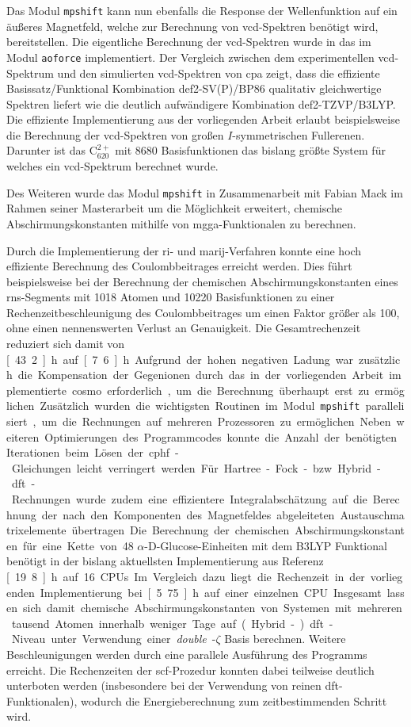 Das Modul \texttt{mpshift} kann nun ebenfalls die Response der Wellenfunktion auf ein äußeres Magnetfeld, welche zur Berechnung von \ac{vcd}-Spektren benötigt wird, bereitstellen. Die eigentliche Berechnung der \ac{vcd}-Spektren wurde in das im Modul \texttt{aoforce} implementiert. Der Vergleich zwischen dem experimentellen \ac{vcd}-Spektrum und den simulierten \ac{vcd}-Spektren von \acl{cpa} zeigt, dass die effiziente Basissatz/Funktional Kombination def2-SV(P)/BP86 qualitativ gleichwertige Spektren liefert wie die deutlich aufwändigere Kombination def2-TZVP/B3LYP. Die effiziente Implementierung aus der vorliegenden Arbeit erlaubt beispielsweise die Berechnung der \ac{vcd}-Spektren von großen $I$-symmetrischen Fullerenen. Darunter ist das C$_{620}^{2+}$ mit 8680 Basisfunktionen das bislang größte System für welches ein \ac{vcd}-Spektrum berechnet wurde.

Des Weiteren wurde das Modul \texttt{mpshift} in Zusammenarbeit mit Fabian Mack im Rahmen seiner Masterarbeit um die Möglichkeit erweitert, chemische Abschirmungskonstanten mithilfe von \ac{mgga}-Funktionalen zu berechnen. 

\bigskip
Durch die Implementierung der \ac{ri}- und \ac{marij}-Verfahren konnte eine hoch effiziente Berechnung des Coulombbeitrages erreicht werden. Dies führt beispielsweise bei der Berechnung der chemischen Abschirmungskonstanten eines \ac{rns}-Segments mit 1018 Atomen und 10220 Basisfunktionen zu einer Rechenzeitbeschleunigung des Coulombbeitrages um einen Faktor größer als 100, ohne einen nennenswerten Verlust an Genauigkeit. Die Gesamtrechenzeit reduziert sich damit von \unit[43.2]{h} auf \unit[7.6]{h}. Aufgrund der hohen negativen Ladung war zusätzlich die Kompensation der Gegenionen durch das in der vorliegenden Arbeit implementierte \ac{cosmo} erforderlich, um die Berechnung überhaupt erst zu ermöglichen. Zusätzlich wurden die wichtigsten Routinen im Modul \texttt{mpshift} parallelisiert, um die Rechnungen auf mehreren Prozessoren zu ermöglichen. Neben weiteren Optimierungen des Programmcodes konnte die Anzahl der benötigten Iterationen beim Lösen der \ac{cphf}-Gleichungen leicht verringert werden. Für Hartree-Fock- bzw. Hybrid-\ac{dft}-Rechnungen wurde zudem eine effizientere Integralabschätzung auf die Berechnung der nach den Komponenten des Magnetfeldes abgeleiteten Austauschmatrixelemente übertragen. Die Berechnung der chemischen Abschirmungskonstanten für eine Kette von 48 $\alpha$-D-Glucose-Einheiten mit dem B3LYP Funktional benötigt in der bislang aktuellsten Implementierung aus Referenz \cite{kumar2016nuclei} \unit[19.8]{h} auf 16 CPUs. Im Vergleich dazu liegt die Rechenzeit in der vorliegenden Implementierung bei \unit[5.75]{h} auf einer einzelnen CPU. Insgesamt lassen sich damit chemische Abschirmungskonstanten von Systemen mit mehreren tausend Atomen innerhalb weniger Tage auf (Hybrid-)\ac{dft}-Niveau unter Verwendung einer \textit{double}-$\zeta$ Basis berechnen. Weitere Beschleunigungen werden durch eine parallele Ausführung des Programms erreicht. Die Rechenzeiten der \ac{scf}-Prozedur konnten dabei teilweise deutlich unterboten werden (insbesondere bei der Verwendung von reinen \ac{dft}-Funktionalen), wodurch die Energieberechnung zum zeitbestimmenden Schritt wird.

